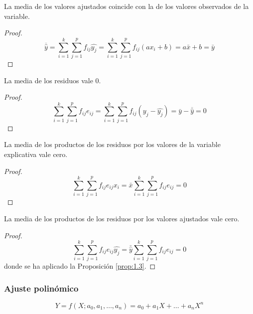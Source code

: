 \begin{lema}\label{lema:2.8}
    La media de los valores ajustados coincide con la de los valores observados de la variable.
\end{lema}
\begin{proof}
    \begin{equation*}
        \overline{\hat{y}} = \sum_{i=1}^k \sum_{j=1}^p f_{ij}\hat{y_j}
        = \sum_{i=1}^k \sum_{j=1}^p f_{ij} (ax_i + b)
        = a\bar{x} + b = \bar{y}
    \end{equation*}
\end{proof}

\begin{coro}
    La media de los residuos vale 0.
\end{coro}
\begin{proof}
    \begin{equation*}
        \sum_{i=1}^k \sum_{j=1}^p f_{ij}e_{ij}
        = \sum_{i=1}^k \sum_{j=1}^p f_{ij} (y_j - \hat{y_j})
        =  \bar{y} - \overline{\hat{y}} = 0
    \end{equation*}
\end{proof}

\begin{coro}
    La media de los productos de los residuos por los valores de la variable explicativa vale cero.
\end{coro}
\begin{proof}
    \begin{equation*}
        \sum_{i=1}^k \sum_{j=1}^p f_{ij} e_{ij}x_i = \bar{x} \sum_{i=1}^k \sum_{j=1}^p f_{ij}e_{ij} = 0
    \end{equation*}
\end{proof}

\begin{coro}
    La media de los productos de los residuos por los valores ajustados vale cero.
\end{coro}
\begin{proof}
    \begin{equation*}
        \sum_{i=1}^k \sum_{j=1}^p f_{ij} e_{ij}\hat{y_j} = \bar{\hat{y}} \sum_{i=1}^k \sum_{j=1}^p f_{ij}e_{ij} = 0
    \end{equation*}
    donde se ha aplicado la Proposición \ref{prop:1.3}.
\end{proof}


\subsubsection{Ajuste polinómico}\vspace{-0.5cm}
\begin{equation*}
    Y=f(X;a_0,a_1,\dots,a_n) = a_0 + a_1X + \dots + a_nX^n
\end{equation*}

